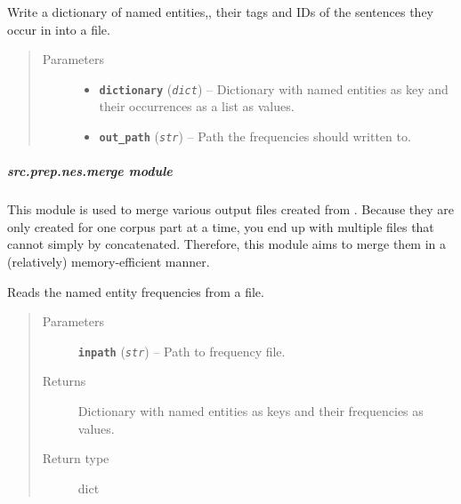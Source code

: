 \documentclass[letterpaper,10pt,english]{sphinxmanual}
\begin{document}

\begin{fulllineitems}
\label{src.prep.nes:src.prep.nes.extract_nes.write_ids_into_file}
Write a dictionary of named entities,, their tags and IDs of the sentences they occur in into a file.
\begin{quote}\begin{description}
\item[{Parameters}] \leavevmode\begin{itemize}
\item {} 
\textbf{\texttt{dictionary}} (\emph{\texttt{dict}}) -- Dictionary with named entities as key and their occurrences as a list as values.

\item {} 
\textbf{\texttt{out\_path}} (\emph{\texttt{str}}) -- Path the frequencies should written to.

\end{itemize}

\end{description}\end{quote}

\end{fulllineitems}



\subparagraph{src.prep.nes.merge module}
\label{src.prep.nes:src-prep-nes-merge-module}\label{src.prep.nes:module-src.prep.nes.merge}
This module is used to merge various output files created from . Because they are only created
for one corpus part at a time, you end up with multiple files that cannot simply by concatenated. Therefore, this module
aims to merge them in a (relatively) memory-efficient manner.

\begin{fulllineitems}
\label{src.prep.nes:src.prep.nes.merge.freq_worker}
Reads the named entity frequencies from a file.
\begin{quote}\begin{description}
\item[{Parameters}] \leavevmode
\textbf{\texttt{inpath}} (\emph{\texttt{str}}) -- Path to frequency file.

\item[{Returns}] \leavevmode
Dictionary with named entities as keys and their frequencies as values.

\item[{Return type}] \leavevmode
dict

\end{description}\end{quote}

\end{fulllineitems}
\end{document}
